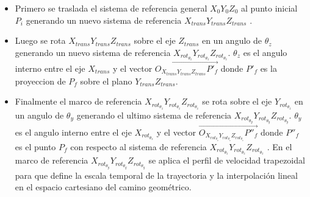     \begin{itemize}
        \item{Primero se traslada el sistema de referencia general $X_0Y_0Z_0$ al punto inicial $P_i$ generando un nuevo sistema de referencia $X_{trans}Y_{trans}Z_{trans}$ . }
        \item {Luego se rota $X_{trans}Y_{trans}Z_{trans}$ sobre el eje $Z_{trans}$ en un angulo de $\theta_z$ generando un nuevo sistema de referencia $X_{rot_{\theta_z}}Y_{rot_{\theta_z}}Z_{rot_{\theta_z}}$. $\theta_z$  es el angulo interno entre el eje $X_{trans}$ y el vector   $\overrightarrow{O_{X_{trans}Y_{trans}Z_{trans}}{P'}_f}$ donde ${P'}_f$ es la  proyeccion de $P_f$ sobre el plano  $Y_{trans}Z_{trans}$.}
        \item{Finalmente el marco de referencia $X_{rot_{\theta_z}}Y_{rot_{\theta_z}}Z_{rot_{\theta_z}}$ se rota sobre el eje  $Y_{rot_{\theta_z}}$ en un angulo de $\theta_y$ generando el ultimo sistema de referencia $X_{rot_{\theta_y}}Y_{rot_{\theta_y}}Z_{rot_{\theta_y}}$.
        $\theta_y$  es el angulo interno entre el eje $X_{rot_{\theta_z}}$ y el vector   $\overrightarrow{O_{X_{rot_{\theta_z}}Y_{rot_{\theta_z}}Z_{rot_{\theta_z}}}{P''}_f}$ donde ${P''}_f$ es el punto  ${P}_f$ con respecto al sistema de referencia  $X_{rot_{\theta_z}}Y_{rot_{\theta_z}}Z_{rot_{\theta_z}}$ .
         En el marco de referencia $X_{rot_{\theta_y}}Y_{rot_{\theta_y}}Z_{rot_{\theta_y}}$ se aplica el perfil de velocidad trapezoidal para que define la escala temporal de la trayectoria y la interpolación lineal en el espacio cartesiano del camino geométrico.}
    \end{itemize}
    






    \newpage

